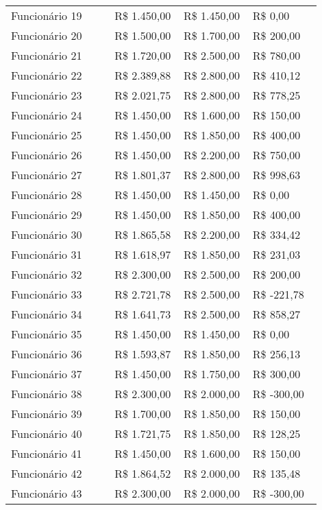 \documentclass[a4paper, 12pt]{CSSullivanBusinessReport}
\begin{document}
\begin{fullwidth}
\begin{longtable}{|L{0.3\linewidth}|R{0.2\linewidth}|R{0.2\linewidth}|R{0.2\linewidth}|}
  Funcionário 19 & R\$ 1.450,00 & R\$ 1.450,00 & R\$    0,00 \\ 
  Funcionário 20 & R\$ 1.500,00 & R\$ 1.700,00 & R\$  200,00 \\ 
  Funcionário 21 & R\$ 1.720,00 & R\$ 2.500,00 & R\$  780,00 \\ 
  Funcionário 22 & R\$ 2.389,88 & R\$ 2.800,00 & R\$  410,12 \\ 
  Funcionário 23 & R\$ 2.021,75 & R\$ 2.800,00 & R\$  778,25 \\ 
  Funcionário 24 & R\$ 1.450,00 & R\$ 1.600,00 & R\$  150,00 \\ 
  Funcionário 25 & R\$ 1.450,00 & R\$ 1.850,00 & R\$  400,00 \\ 
  Funcionário 26 & R\$ 1.450,00 & R\$ 2.200,00 & R\$  750,00 \\ 
  Funcionário 27 & R\$ 1.801,37 & R\$ 2.800,00 & R\$  998,63 \\ 
  Funcionário 28 & R\$ 1.450,00 & R\$ 1.450,00 & R\$    0,00 \\ 
  Funcionário 29 & R\$ 1.450,00 & R\$ 1.850,00 & R\$  400,00 \\ 
  Funcionário 30 & R\$ 1.865,58 & R\$ 2.200,00 & R\$  334,42 \\ 
  Funcionário 31 & R\$ 1.618,97 & R\$ 1.850,00 & R\$  231,03 \\ 
  Funcionário 32 & R\$ 2.300,00 & R\$ 2.500,00 & R\$  200,00 \\ 
  Funcionário 33 & R\$ 2.721,78 & R\$ 2.500,00 & \textcolor{slightlyred}{R\$ -221,78} \\ 
  Funcionário 34 & R\$ 1.641,73 & R\$ 2.500,00 & R\$  858,27 \\ 
  Funcionário 35 & R\$ 1.450,00 & R\$ 1.450,00 & R\$    0,00 \\ 
  Funcionário 36 & R\$ 1.593,87 & R\$ 1.850,00 & R\$  256,13 \\ 
  Funcionário 37 & R\$ 1.450,00 & R\$ 1.750,00 & R\$  300,00 \\ 
  Funcionário 38 & R\$ 2.300,00 & R\$ 2.000,00 & \textcolor{slightlyred}{R\$ -300,00} \\ 
  Funcionário 39 & R\$ 1.700,00 & R\$ 1.850,00 & R\$  150,00 \\ 
  Funcionário 40 & R\$ 1.721,75 & R\$ 1.850,00 & R\$  128,25 \\ 
  Funcionário 41 & R\$ 1.450,00 & R\$ 1.600,00 & R\$  150,00 \\ 
  Funcionário 42 & R\$ 1.864,52 & R\$ 2.000,00 & R\$  135,48 \\ 
  Funcionário 43 & R\$ 2.300,00 & R\$ 2.000,00 & \textcolor{slightlyred}{R\$ -300,00} \\ 

\end{longtable}
\end{fullwidth}
\end{document}
